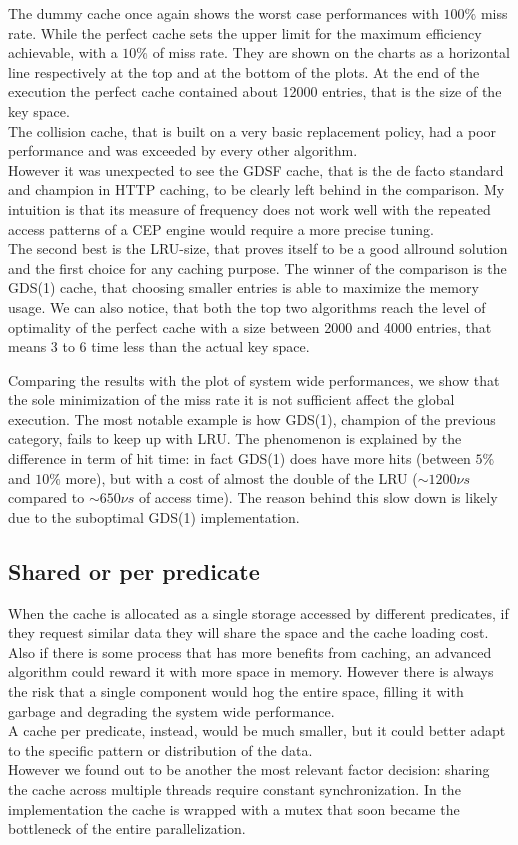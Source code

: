 The dummy cache once again shows the worst case performances with $100\%$ miss rate. While the perfect cache sets the upper limit for the maximum efficiency achievable, with a $10\%$ of miss rate. They are shown on the charts as a horizontal line respectively at the top and at the bottom of the plots. At the end of the execution the perfect cache contained about 12000 entries, that is the size of the key space.\\
The collision cache, that is built on a very basic replacement policy, had a poor performance and was exceeded by every other algorithm.\\
However it was unexpected to see the GDSF cache, that is the de facto standard and champion in HTTP caching, to be clearly left behind in the comparison. My intuition is that its measure of frequency does not work well with the repeated access patterns of a CEP engine would require a more precise tuning.\\
The second best is the LRU-size, that proves itself to be a good allround solution and the first choice for any caching purpose. The winner of the comparison is the GDS(1) cache, that choosing smaller entries is able to maximize the memory usage. We can also notice, that both the top two algorithms reach the level of optimality of the perfect cache with a size between 2000 and 4000 entries, that means 3 to 6 time less than the actual key space.

Comparing the results with the plot of system wide performances, we show that the sole minimization of the miss rate it is not sufficient affect the global execution. The most notable example is how GDS(1), champion of the previous category, fails to keep up with LRU. The phenomenon is explained by the difference in term of hit time: in fact GDS(1) does have more hits (between $5\%$ and $10\%$ more), but with a cost of almost the double of the LRU ($\sim 1200 \nu s$ compared to $\sim 650 \nu s$ of access time). The reason behind this slow down is likely due to the suboptimal GDS(1) implementation.

\subsection{Shared or per predicate}
When the cache is allocated as a single storage accessed by different predicates, if they request similar data they will share the space and the cache loading cost. Also if there is some process that has more benefits from caching, an advanced algorithm could reward it with more space in memory. However there is always the risk that a single component would hog the entire space, filling it with garbage and degrading the system wide performance.\\
A cache per predicate, instead, would be much smaller, but it could better adapt to the specific pattern or distribution of the data.\\
However we found out to be another the most relevant factor decision: sharing the cache across multiple threads require constant synchronization. In the implementation the cache is wrapped with a mutex that soon became the bottleneck of the entire parallelization.

